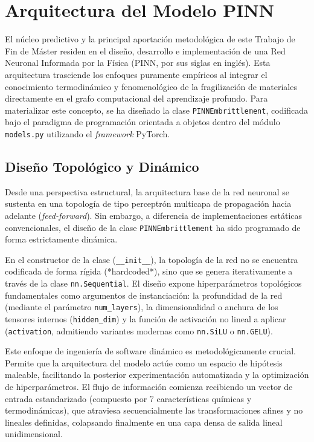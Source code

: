 \documentclass[a4paper, 12pt, twocolumn]{book}
\begin{document}
\section{Arquitectura del Modelo PINN}

El núcleo predictivo y la principal aportación metodológica de este Trabajo de Fin de Máster residen en el diseño, desarrollo e implementación de una Red Neuronal Informada por la Física (PINN, por sus siglas en inglés). Esta arquitectura trasciende los enfoques puramente empíricos al integrar el conocimiento termodinámico y fenomenológico de la fragilización de materiales directamente en el grafo computacional del aprendizaje profundo. Para materializar este concepto, se ha diseñado la clase \texttt{PINNEmbrittlement}, codificada bajo el paradigma de programación orientada a objetos dentro del módulo \texttt{models.py} utilizando el \textit{framework} PyTorch.

\subsection{Diseño Topológico y Dinámico}

Desde una perspectiva estructural, la arquitectura base de la red neuronal se sustenta en una topología de tipo perceptrón multicapa de propagación hacia adelante (\textit{feed-forward}). Sin embargo, a diferencia de implementaciones estáticas convencionales, el diseño de la clase \texttt{PINNEmbrittlement} ha sido programado de forma estrictamente dinámica. 

En el constructor de la clase (\texttt{\_\_init\_\_}), la topología de la red no se encuentra codificada de forma rígida (*hardcoded*), sino que se genera iterativamente a través de la clase \texttt{nn.Sequential}. El diseño expone hiperparámetros topológicos fundamentales como argumentos de instanciación: la profundidad de la red (mediante el parámetro \texttt{num\_layers}), la dimensionalidad o anchura de los tensores internos (\texttt{hidden\_dim}) y la función de activación no lineal a aplicar (\texttt{activation}, admitiendo variantes modernas como \texttt{nn.SiLU} o \texttt{nn.GELU}). 

Este enfoque de ingeniería de software dinámico es metodológicamente crucial. Permite que la arquitectura del modelo actúe como un espacio de hipótesis maleable, facilitando la posterior experimentación automatizada y la optimización de hiperparámetros. El flujo de información comienza recibiendo un vector de entrada estandarizado (compuesto por 7 características químicas y termodinámicas), que atraviesa secuencialmente las transformaciones afines y no lineales definidas, colapsando finalmente en una capa densa de salida lineal unidimensional.
\end{document}
